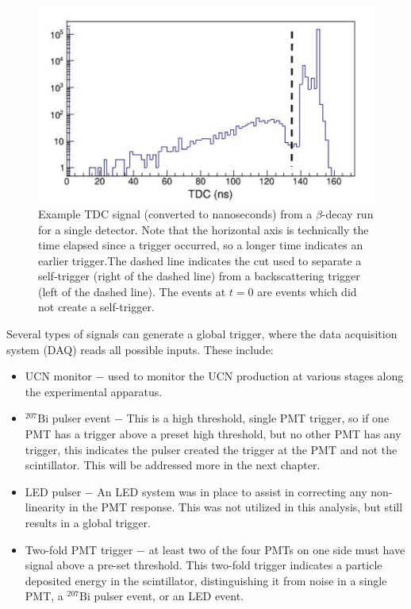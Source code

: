 \begin{figure}
  \centering
  \includegraphics[page=1,scale=0.60]{2-UCNAExperiment/TDCSignal.pdf}
  \caption{Example TDC signal (converted to nanoseconds) from a $\beta$-decay run for a single
    detector.
    Note that the horizontal axis is technically the time elapsed since a trigger occurred,
    so a longer time indicates an earlier
    trigger.The dashed line
    indicates the cut used to separate a self-trigger (right of the dashed line) from a backscattering trigger
    (left of the dashed line).  The events at $t=0$ are events which did not create a self-trigger.}
  \label{fig:TDCsig}
\end{figure}


Several types of signals can generate a global trigger, where the data acquisition system (DAQ)
reads all possible inputs. These include:
%
\begin{itemize}
\item UCN monitor $-$ used to monitor the UCN production at various
  stages along the experimental apparatus.
\item $^{207}\mathrm{Bi}$ pulser event $-$ This is a high threshold, single PMT trigger, so if one PMT
  has a trigger above a preset high threshold, but no other PMT has any trigger, this indicates the
  pulser created the trigger at the PMT and not the scintillator. This will be addressed more in the
  next chapter.
\item LED pulser $-$ An LED system was in place to assist in correcting any non-linearity in the
  PMT response. This was not utilized in this analysis, but still results in a global trigger.
\item Two-fold PMT trigger $-$ at least two of the four PMTs on one side must have signal above a pre-set
  threshold. This two-fold trigger indicates a particle deposited energy in the scintillator,
  distinguishing it from noise in a single PMT, a $^{207}\mathrm{Bi}$ pulser event, or an LED event.
\end{itemize}


